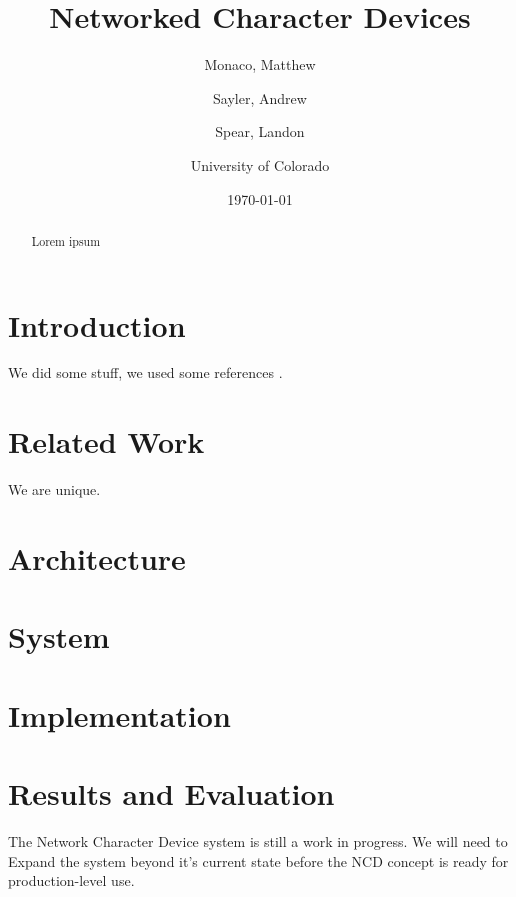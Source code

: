 \documentclass[11pt,twocolumn]{article}
\begin{document}
\title{Networked Character Devices}
\author{Monaco, Matthew \and Sayler, Andrew \and Spear, Landon
  \\ \and University of Colorado}
\date{\today}

\maketitle

\begin{abstract}
Lorem ipsum
\end{abstract}


\section{Introduction}
\label{sec:introduction}

We did some stuff, we used some references \cite{ldd3}.

\section{Related Work}
\label{sec:relatedwork}

We are unique.


\section{Architecture}
\label{sec:architecture}

\section{System}
\label{sec:system}

\section{Implementation}
\label{sec:implementation}


\section{Results and Evaluation}
\label{sec:results}

The Network Character Device system is still a work in
progress. We will need to Expand the system beyond it's current state
before the NCD concept is ready for production-level use.
\end{document}

